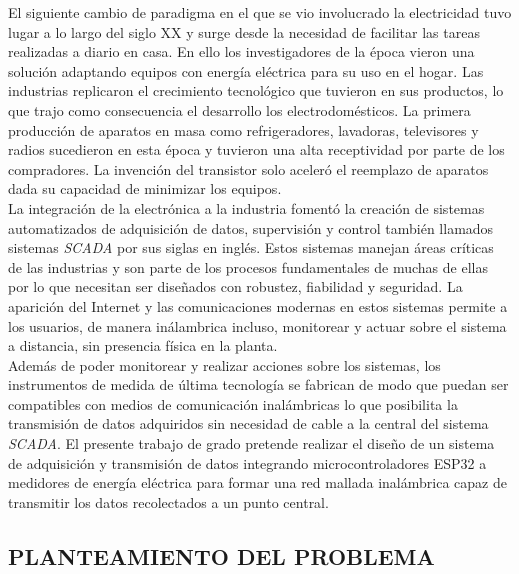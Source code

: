 \documentclass[12pt,letterpaper]{article}
\begin{document}
El siguiente cambio de paradigma en el que se vio involucrado la electricidad tuvo lugar a lo largo del siglo XX y surge desde la necesidad de facilitar las tareas realizadas a diario en casa. En ello los investigadores de la época vieron una solución adaptando equipos con energía eléctrica para su uso en el hogar. Las industrias replicaron el crecimiento tecnológico que tuvieron en sus productos, lo que trajo como consecuencia el desarrollo los electrodomésticos. La primera producción de aparatos en masa como refrigeradores, lavadoras, televisores y radios sucedieron en esta época y tuvieron una alta receptividad por parte de los compradores. La invención del transistor solo aceleró el reemplazo de aparatos dada su capacidad de minimizar los equipos.\\

La integración de la electrónica a la industria fomentó la creación de sistemas automatizados de adquisición de datos, supervisión y control también llamados sistemas \textit{SCADA} por sus siglas en inglés. Estos sistemas manejan áreas críticas de las industrias y son parte de los procesos fundamentales de muchas de ellas por lo que necesitan ser diseñados con robustez, fiabilidad y seguridad. La aparición del Internet y las comunicaciones modernas en estos sistemas permite a los usuarios, de manera inálambrica incluso, monitorear y actuar sobre el sistema a distancia, sin presencia física en la planta.\\

Además de poder monitorear y realizar acciones sobre los sistemas, los instrumentos de medida de última tecnología se fabrican de modo que puedan ser compatibles con medios de comunicación inalámbricas lo que posibilita la transmisión de datos adquiridos sin necesidad de cable a la central del sistema \textit{SCADA}. El presente trabajo de grado pretende realizar el diseño de un sistema de adquisición y transmisión de datos integrando microcontroladores ESP32 a medidores de energía eléctrica para formar una red mallada inalámbrica capaz de transmitir los datos recolectados a un punto central.

\newpage

		
\begin{center}
		\section*{ PLANTEAMIENTO DEL PROBLEMA}

\end{center}
\end{document}

